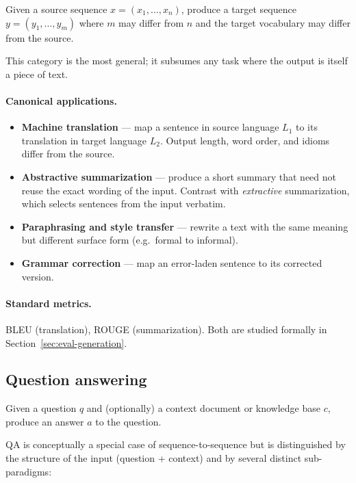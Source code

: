 \begin{definition}
Given a source sequence $x = (x_1, \dots, x_n)$, produce a target sequence $y = (y_1, \dots, y_m)$ where $m$ may differ from $n$ and the target vocabulary may differ from the source.
\end{definition}

This category is the most general; it subsumes any task where the output is itself a piece of text.

\paragraph{Canonical applications.}
\begin{itemize}
    \item \textbf{Machine translation} --- map a sentence in source language $L_1$ to its translation in target language $L_2$. Output length, word order, and idioms differ from the source.
    \item \textbf{Abstractive summarization} --- produce a short summary that need not reuse the exact wording of the input. Contrast with \emph{extractive} summarization, which selects sentences from the input verbatim.
    \item \textbf{Paraphrasing and style transfer} --- rewrite a text with the same meaning but different surface form (e.g.\ formal to informal).
    \item \textbf{Grammar correction} --- map an error-laden sentence to its corrected version.
\end{itemize}

\paragraph{Standard metrics.} BLEU (translation), ROUGE (summarization). Both are studied formally in Section~\ref{sec:eval-generation}.

\subsection{Question answering}

\begin{definition}
Given a question $q$ and (optionally) a context document or knowledge base $c$, produce an answer $a$ to the question.
\end{definition}

QA is conceptually a special case of sequence-to-sequence but is distinguished by the structure of the input (question + context) and by several distinct sub-paradigms:

